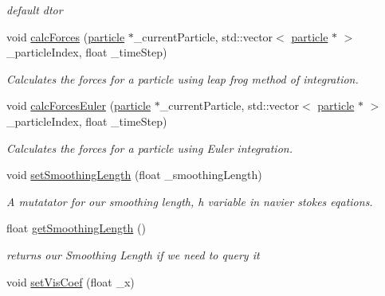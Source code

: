 \begin{DoxyCompactItemize}
\begin{DoxyCompactList}\small\item\em default dtor \end{DoxyCompactList}\item 
void \hyperlink{classSPHSolver_ab7408071375d37e5455d90b53a02f444}{calc\-Forces} (\hyperlink{classparticle}{particle} $\ast$\-\_\-current\-Particle, std\-::vector$<$ \hyperlink{classparticle}{particle} $\ast$ $>$ \-\_\-particle\-Index, float \-\_\-time\-Step)
\begin{DoxyCompactList}\small\item\em Calculates the forces for a particle using leap frog method of integration. \end{DoxyCompactList}\item 
void \hyperlink{classSPHSolver_a27b0bebb170b2613a5ff0e681b64abe8}{calc\-Forces\-Euler} (\hyperlink{classparticle}{particle} $\ast$\-\_\-current\-Particle, std\-::vector$<$ \hyperlink{classparticle}{particle} $\ast$ $>$ \-\_\-particle\-Index, float \-\_\-time\-Step)
\begin{DoxyCompactList}\small\item\em Calculates the forces for a particle using Euler integration. \end{DoxyCompactList}\item 
void \hyperlink{classSPHSolver_a443a24a01177a91acb7a5c3e19d7283a}{set\-Smoothing\-Length} (float \-\_\-smoothing\-Length)
\begin{DoxyCompactList}\small\item\em A mutatator for our smoothing length, h variable in navier stokes eqations. \end{DoxyCompactList}\item 
\hypertarget{classSPHSolver_ab6f67635e1a6013adc6fa7e94312062d}{float \hyperlink{classSPHSolver_ab6f67635e1a6013adc6fa7e94312062d}{get\-Smoothing\-Length} ()}\label{classSPHSolver_ab6f67635e1a6013adc6fa7e94312062d}

\begin{DoxyCompactList}\small\item\em returns our Smoothing Length if we need to query it \end{DoxyCompactList}\item 
\hypertarget{classSPHSolver_a01c0580448eee39044bd624985cef25e}{void \hyperlink{classSPHSolver_a01c0580448eee39044bd624985cef25e}{set\-Vis\-Coef} (float \-\_\-x)}\label{classSPHSolver_a01c0580448eee39044bd624985cef25e}


\end{DoxyCompactItemize}

